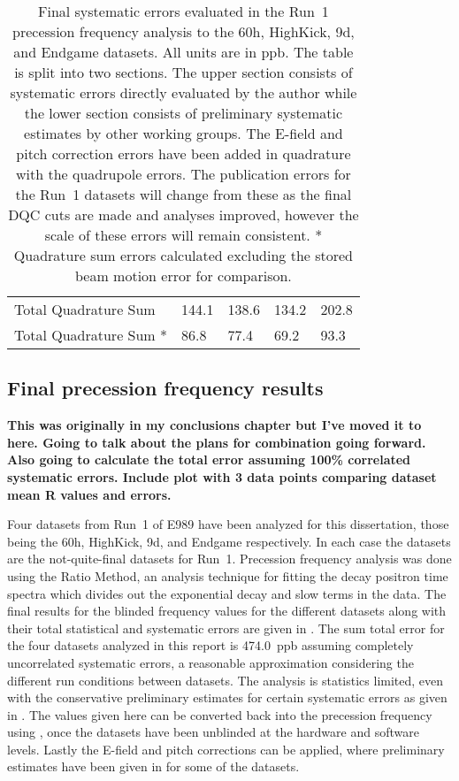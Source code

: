 \begin{table}
\begin{tabular*}{\linewidth}{@{\extracolsep{\fill}}lGGGG}
  \hline\hline
    Total Quadrature Sum & 144.1 & 138.6 & 134.2 & 202.8 \\
    Total Quadrature Sum * & 86.8 & 77.4 & 69.2 & 93.3 \\
  \hline
\end{tabular*}
\caption[Systematic errors evaluated in the Run~1 precession frequency datasets]{Final systematic errors evaluated in the Run~1 precession frequency analysis to the 60h, HighKick, 9d, and Endgame datasets. All units are in ppb. The table is split into two sections. The upper section consists of systematic errors directly evaluated by the author while the lower section consists of preliminary systematic estimates by other working groups. The E-field and pitch correction errors have been added in quadrature with the quadrupole errors. The publication errors for the Run~1 datasets will change from these as the final DQC cuts are made and analyses improved, however the scale of these errors will remain consistent. * Quadrature sum errors calculated excluding the stored beam motion error for comparison.}
\label{tab:FinalSystematicErrors}
\end{table}




\subsection{Final precession frequency results}


\textbf{This was originally in my conclusions chapter but I've moved it to here. Going to talk about the plans for combination going forward. Also going to calculate the total error assuming 100\% correlated systematic errors. Include plot with 3 data points comparing dataset mean R values and errors.}



Four datasets from Run~1 of E989 have been analyzed for this dissertation, those being the 60h, HighKick, 9d, and Endgame respectively. In each case the datasets are the not-quite-final datasets for Run~1. Precession frequency analysis was done using the Ratio Method, an analysis technique for fitting the decay positron time spectra which divides out the exponential decay and slow terms in the data. The final results for the blinded frequency \R values for the different datasets along with their total statistical and systematic errors are given in . The sum total error for the four datasets analyzed in this report is \SI{474.0}{ppb} assuming completely uncorrelated systematic errors, a reasonable approximation considering the different run conditions between datasets. The analysis is statistics limited, even with the conservative preliminary estimates for certain systematic errors as given in . The \R values given here can be converted back into the precession frequency \wa using , once the datasets have been unblinded at the hardware and software levels. Lastly the E-field and pitch corrections can be applied, where preliminary estimates have been given in  for some of the datasets. 



